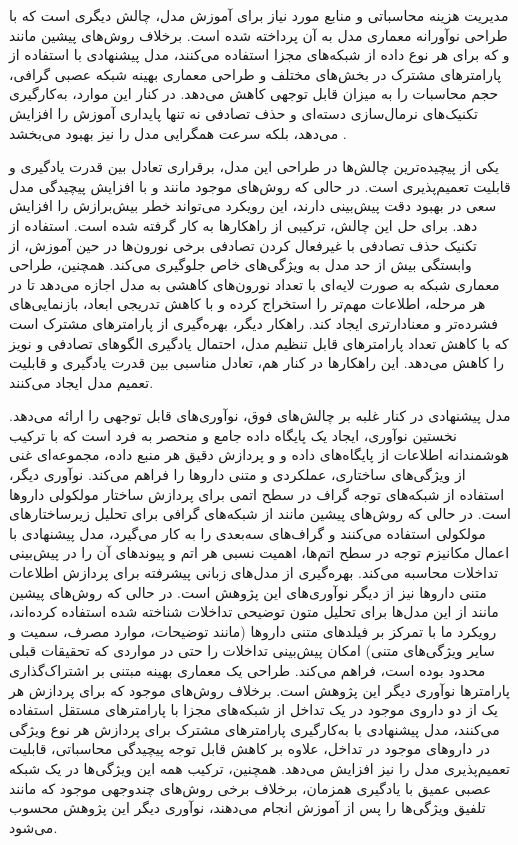 مدیریت هزینه محاسباتی و منابع مورد نیاز برای آموزش مدل، چالش دیگری است که با طراحی نوآورانه معماری مدل به آن پرداخته شده است. برخلاف روش‌های پیشین  مانند \cite{ref_ryu2018} و \cite{ref_lin2022} که برای هر نوع داده از شبکه‌های مجزا استفاده می‌کنند، مدل پیشنهادی با استفاده از پارامترهای مشترک در بخش‌های مختلف و طراحی معماری بهینه شبکه عصبی گرافی، حجم محاسبات را به میزان قابل توجهی کاهش می‌دهد. در کنار این موارد، به‌کارگیری تکنیک‌های نرمال‌سازی دسته‌ای و حذف تصادفی نه تنها پایداری آموزش را افزایش می‌دهد، بلکه سرعت همگرایی مدل را نیز بهبود می‌بخشد \cite{ref_nyamabo2021}.

یکی از پیچیده‌ترین چالش‌ها در طراحی این مدل، برقراری تعادل بین قدرت یادگیری و قابلیت تعمیم‌پذیری است. در حالی که روش‌های موجود مانند \cite{ref_he2023} و \cite{ref_shi2024} با افزایش پیچیدگی مدل سعی در بهبود دقت پیش‌بینی دارند، این رویکرد می‌تواند خطر بیش‌برازش را افزایش دهد. برای حل این چالش، ترکیبی از راهکارها به کار گرفته شده است. استفاده از تکنیک حذف تصادفی با غیرفعال کردن تصادفی برخی نورون‌ها در حین آموزش، از وابستگی بیش از حد مدل به ویژگی‌های خاص جلوگیری می‌کند. همچنین، طراحی معماری شبکه به صورت لایه‌ای با تعداد نورون‌های کاهشی به مدل اجازه می‌دهد تا در هر مرحله، اطلاعات مهم‌تر را استخراج کرده و با کاهش تدریجی ابعاد، بازنمایی‌های فشرده‌تر و معنادارتری ایجاد کند. راهکار دیگر، بهره‌گیری از پارامترهای مشترک است که با کاهش تعداد پارامترهای قابل تنظیم مدل، احتمال یادگیری الگوهای تصادفی و نویز را کاهش می‌دهد. این راهکارها در کنار هم، تعادل مناسبی بین قدرت یادگیری و قابلیت تعمیم مدل ایجاد می‌کنند.

مدل پیشنهادی در کنار غلبه بر چالش‌های فوق، نوآوری‌های قابل توجهی را ارائه می‌دهد. نخستین نوآوری، ایجاد یک پایگاه داده جامع و منحصر به فرد است که با ترکیب هوشمندانه اطلاعات از پایگاه‌های داده  و  و پردازش دقیق هر منبع داده، مجموعه‌ای غنی از ویژگی‌های ساختاری، عملکردی و متنی داروها را فراهم می‌کند. نوآوری دیگر، استفاده از شبکه‌های توجه گراف در سطح اتمی برای پردازش ساختار مولکولی داروها است. در حالی که روش‌های پیشین مانند  \cite{ref_nyamabo2021} از شبکه‌های گرافی برای تحلیل زیرساختارهای مولکولی استفاده می‌کنند و  \cite{ref_he2023} گراف‌های سه‌بعدی را به کار می‌گیرد، مدل پیشنهادی با اعمال مکانیزم توجه در سطح اتم‌ها، اهمیت نسبی هر اتم و پیوندهای آن را در پیش‌بینی تداخلات محاسبه می‌کند. بهره‌گیری از مدل‌های زبانی پیشرفته برای پردازش اطلاعات متنی داروها نیز از دیگر نوآوری‌های این پژوهش است. در حالی که روش‌های پیشین مانند  \cite{ref_shi2024} از این مدل‌ها برای تحلیل متون توضیحی تداخلات شناخته شده استفاده کرده‌اند، رویکرد ما با تمرکز بر فیلدهای متنی داروها (مانند توضیحات، موارد مصرف، سمیت و سایر ویژگی‌های متنی) امکان پیش‌بینی تداخلات را حتی در مواردی که تحقیقات قبلی محدود بوده است، فراهم می‌کند. طراحی یک معماری بهینه مبتنی بر اشتراک‌گذاری پارامترها نوآوری دیگر این پژوهش است. برخلاف روش‌های موجود که برای پردازش هر یک از دو داروی موجود در یک تداخل از شبکه‌های مجزا با پارامترهای مستقل استفاده می‌کنند، مدل پیشنهادی با به‌کارگیری پارامترهای مشترک برای پردازش هر نوع ویژگی در داروهای موجود در تداخل، علاوه بر کاهش قابل توجه پیچیدگی محاسباتی، قابلیت تعمیم‌پذیری مدل را نیز افزایش می‌دهد.  همچنین، ترکیب همه این ویژگی‌ها در یک شبکه عصبی عمیق با یادگیری همزمان، برخلاف برخی روش‌های چندوجهی موجود که مانند  \cite{ref_deng2020} تلفیق ویژگی‌ها را پس از آموزش انجام می‌دهند، نوآوری دیگر این پژوهش محسوب می‌شود.
